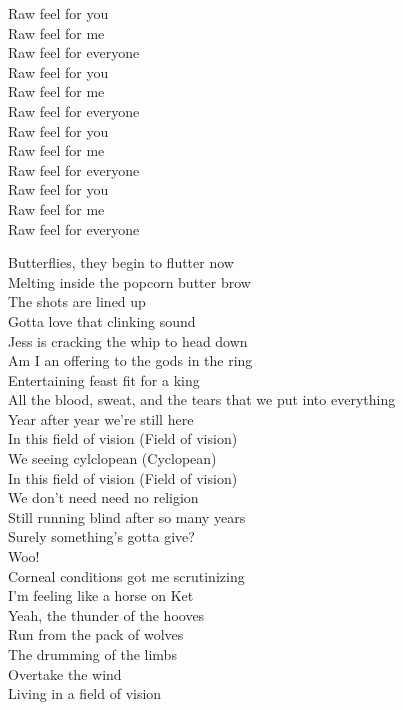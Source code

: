 Raw feel for you \\
Raw feel for me \\
Raw feel for everyone \\
Raw feel for you \\
Raw feel for me \\
Raw feel for everyone \\
Raw feel for you \\
Raw feel for me \\
Raw feel for everyone \\
Raw feel for you \\
Raw feel for me \\
Raw feel for everyone \\



Butterflies, they begin to flutter now \\
Melting inside the popcorn butter brow \\
The shots are lined up \\
Gotta love that clinking sound \\
Jess is cracking the whip to head down \\

Am I an offering to the gods in the ring \\
Entertaining feast fit for a king \\
All the blood, sweat, and the tears that we put into everything \\
Year after year we're still here \\

In this field of vision (Field of vision) \\
We seeing cylclopean (Cyclopean) \\
In this field of vision (Field of vision) \\
We don't need need no religion \\

Still running blind after so many years \\
Surely something's gotta give? \\
Woo! \\
Corneal conditions got me scrutinizing \\
I'm feeling like a horse on Ket \\
Yeah, the thunder of the hooves \\
Run from the pack of wolves \\
The drumming of the limbs \\
Overtake the wind \\
Living in a field of vision \\

